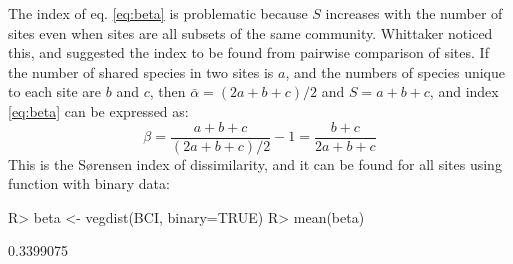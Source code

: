 \documentclass[article,nojss]{jss}
\begin{document}
The index of eq. \ref{eq:beta} is problematic because $S$ increases
with the number of sites even when sites are all subsets of the same
community.  Whittaker noticed this, and suggested the index to be
found from pairwise comparison of sites. If the number of shared
species in two sites is $a$, and the numbers of species unique to each
site are $b$ and $c$, then $\bar \alpha = (2a + b + c)/2$ and $S =
a+b+c$, and index \ref{eq:beta} can be expressed as:
\begin{equation}
  \label{eq:betabray}
  \beta = \frac{a+b+c}{(2a+b+c)/2} - 1 = \frac{b+c}{2a+b+c}
\end{equation}
This is the S{\o}rensen index of dissimilarity, and it can be found
for all sites using  function  with
binary data:
\begin{Schunk}
\begin{Sinput}
R> beta <- vegdist(BCI, binary=TRUE)
R> mean(beta)
\end{Sinput}
\begin{Soutput}
[1] 0.3399075
\end{Soutput}
\end{Schunk}
\end{document}
